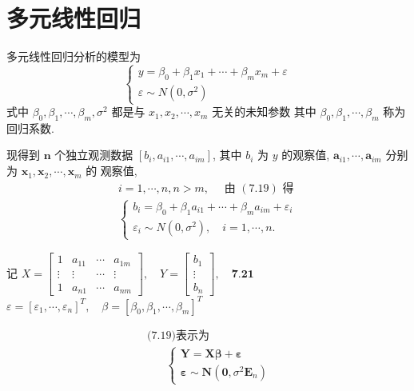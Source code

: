 \section{多元线性回归}

多元线性回归分析的模型为
$$
\left\{\begin{array}{l}
y=\beta_{0}+\beta_{1} x_{1}+\cdots+\beta_{m} x_{m}+\varepsilon \\
\varepsilon \sim N\left(0, \sigma^{2}\right)
\end{array}\right.
$$
式中 \( \beta_{0}, \beta_{1}, \cdots, \beta_{m}, \sigma^{2} \) 都是与 \( x_{1}, x_{2}, \cdots, x_{m} \) 无关的未知参数
其中 \( \beta_{0}, \beta_{1}, \cdots, \beta_{m} \) 称为回归系数. 

现得到 \( \boldsymbol{n} \) 个独立观测数据 \( \left[b_{i}, a_{i 1}, \cdots, a_{i m}\right] \), 其中 \( b_{i} \) 为 \( y \) 的观察值, \( \boldsymbol{a}_{i 1}, \cdots, \boldsymbol{a}_{i m} \) 分别为 \( \boldsymbol{x}_{1}, \boldsymbol{x}_{2}, \cdots, \boldsymbol{x}_{m} \) 的 观察值,
$$
\begin{aligned}
i=1, \cdots, n, n>m, \quad \text { 由 }(7.19) \text { 得 } \\
\left\{\begin{array}{l}
b_{i}=\beta_{0}+\beta_{1} a_{i 1}+\cdots+\beta_{m} a_{i m}+\varepsilon_{i} \\
\varepsilon_{i} \sim N\left(0, \sigma^{2}\right), \quad i=1, \cdots, n .
\end{array}\right.
\end{aligned}
$$

记 \( X=\left[\begin{array}{cccc}1 & a_{11} & \cdots & a_{1 m} \\ \vdots & \vdots & \cdots & \vdots \\ 1 & a_{n 1} & \cdots & a_{n m}\end{array}\right], \quad Y=\left[\begin{array}{c}b_{1} \\ \vdots \\ b_{n}\end{array}\right], \quad \mathbf{7 . 2 1} \)
\( \varepsilon=\left[\varepsilon_{1}, \cdots, \varepsilon_{n}\right]^{T}, \quad \beta=\left[\beta_{0}, \beta_{1}, \cdots, \beta_{m}\right]^{T} \)

$$
\begin{array}{l}
\text { (7.19)表示为 } \\
\qquad\left\{\begin{array}{l}
\boldsymbol{Y}=\boldsymbol{X} \boldsymbol{\beta}+\boldsymbol{\varepsilon} \\
\boldsymbol{\varepsilon} \sim \boldsymbol{N}\left(\mathbf{0}, \sigma^{2} \boldsymbol{E}_{n}\right)
\end{array}\right.
\end{array}
$$

